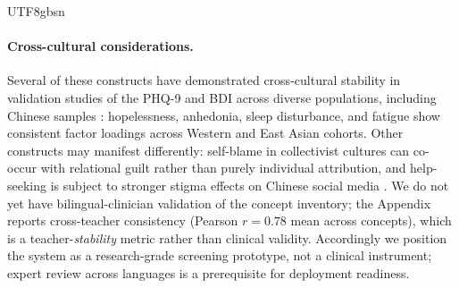 \documentclass[lettersize,journal]{IEEEtran}
\renewcommand{\arraystretch}{0.99}
\begin{document}
\begin{CJK*}{UTF8}{gbsn}
\paragraph{Cross-cultural considerations.}
Several of these constructs have demonstrated cross-cultural stability in validation studies of the PHQ-9 and BDI across diverse populations, including Chinese samples \cite{kroenke2001phq,beck1972measuring}: hopelessness, anhedonia, sleep disturbance, and fatigue show consistent factor loadings across Western and East Asian cohorts. Other constructs may manifest differently: self-blame in collectivist cultures can co-occur with relational guilt rather than purely individual attribution, and help-seeking is subject to stronger stigma effects on Chinese social media \cite{koh2020concept}. We do not yet have bilingual-clinician validation of the concept inventory; the Appendix reports cross-teacher consistency (Pearson $r{=}0.78$ mean across concepts), which is a teacher-\emph{stability} metric rather than clinical validity. Accordingly we position the system as a research-grade screening prototype, not a clinical instrument; expert review across languages is a prerequisite for deployment readiness.
\begin{table}[t]
\centering
\caption{Concept inventory ($K{=}12$) with psychological grounding.}
\label{tab:concepts}
\renewcommand{\arraystretch}{1.05}
\end{table}
\end{CJK*}
\end{document}
